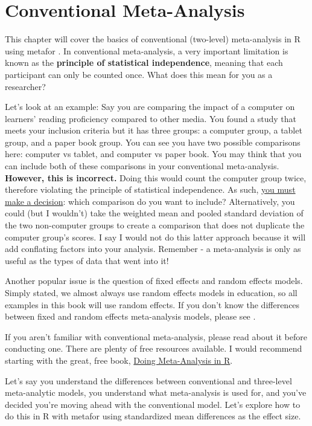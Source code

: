 \documentclass[
]{book}
\begin{document}
\hypertarget{meta}{%
\chapter{Conventional Meta-Analysis}\label{meta}}

This chapter will cover the basics of conventional (two-level) meta-analysis in R using metafor \citep{viechtbauer2010}. In conventional meta-analysis, a very important limitation is known as the \textbf{principle of statistical independence}, meaning that each participant can only be counted once. What does this mean for you as a researcher?

Let's look at an example: Say you are comparing the impact of a computer on learners' reading proficiency compared to other media. You found a study that meets your inclusion criteria but it has three groups: a computer group, a tablet group, and a paper book group. You can see you have two possible comparisons here: computer vs tablet, and computer vs paper book. You may think that you can include both of these comparisons in your conventional meta-analysis. \textbf{However, this is incorrect.} Doing this would count the computer group twice, therefore violating the principle of statistical independence. As such, \ul{you must make a decision}: which comparison do you want to include? Alternatively, you could (but I wouldn't) take the weighted mean and pooled standard deviation of the two non-computer groups to create a comparison that does not duplicate the computer group's scores. I say I would not do this latter approach because it will add conflating factors into your analysis. Remember - a meta-analysis is only as useful as the types of data that went into it!

Another popular issue is the question of fixed effects and random effects models. Simply stated, we almost always use random effects models in education, so all examples in this book will use random effects. If you don't know the differences between fixed and random effects meta-analysis models, please see \citep{borenstein2010}.

If you aren't familiar with conventional meta-analysis, please read about it before conducting one. There are plenty of free resources available. I would recommend starting with the great, free book, \href{https://bookdown.org/MathiasHarrer/Doing_Meta_Analysis_in_R/}{Doing Meta-Analysis in R}\citep{harrer2021}.

Let's say you understand the differences between conventional and three-level meta-analytic models, you understand what meta-analysis is used for, and you've decided you're moving ahead with the conventional model. Let's explore how to do this in R with metafor\citep{viechtbauer2010} using standardized mean differences as the effect size.
\end{document}
